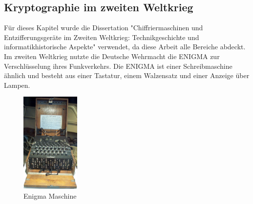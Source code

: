 \subsection{Kryptographie im zweiten Weltkrieg}
Für dieses Kapitel wurde die Dissertation "Chiffriermaschinen und Entzifferungsgeräte
im Zweiten Weltkrieg: Technikgeschichte und informatikhistorische Aspekte" \cite{enigma} verwendet, da diese Arbeit alle Bereiche abdeckt. \\
Im zweiten Weltkrieg nutzte die Deutsche Wehrmacht die ENIGMA  zur Verschlüsselung ihres Funkverkehrs. Die ENIGMA ist einer Schreibmaschine ähnlich und besteht aus einer Tastatur, einem Walzensatz und einer Anzeige über Lampen. 
%
\begin{figure}[ht]
\begin{center}
\includegraphics[height=5cm]{images/Enigma_Verkehrshaus_Luzern_cropped.jpg}
\caption{Enigma Maschine}
\label{fig:enigma}
\end{center}
\end{figure}
%
